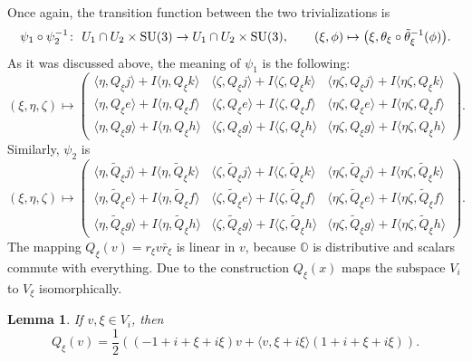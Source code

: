 \documentclass[pdftex]{sigma}
\numberwithin{equation}{section}
\newtheorem{Lemma}[Theorem]{Lemma}
\newcommand{\SO}{\mathbb{O}} %
\begin{document}
Once again, the transition function between the two trivializations is
\[\psi_1 \circ \psi_2^{-1}\colon \ U_1 \cap U_2 \times {\rm SU}(3) \rightarrow U_1 \cap U_2\times {\rm SU}(3), \qquad (\xi,\phi) \mapsto \big(\xi, \theta_\xi \circ \tilde{\theta}_\xi^{-1}(\phi) \big).\]
As it was discussed above, the meaning of $\psi_1$ is the following:
\[ (\xi,\eta,\zeta) \mapsto
\begin{pmatrix}
\langle \eta,Q_\xi j \rangle + I\langle \eta, Q_\xi k \rangle & \langle \zeta, Q_\xi j \rangle + I\langle \zeta, Q_\xi k \rangle & \langle \eta \zeta, Q_\xi j \rangle + I\langle \eta \zeta,Q_\xi k \rangle\\
\langle \eta,Q_\xi e \rangle +I\langle \eta,Q_\xi f \rangle & \langle \zeta,Q_\xi e \rangle +I\langle \zeta,Q_\xi f \rangle & \langle \eta \zeta,Q_\xi e \rangle +I\langle \eta \zeta,Q_\xi f \rangle\\
\langle \eta,Q_\xi g \rangle +I\langle \eta,Q_\xi h \rangle & \langle \zeta,Q_\xi g \rangle +I\langle \zeta,Q_\xi h \rangle & \langle \eta \zeta,Q_\xi g \rangle +I\langle \eta \zeta,Q_\xi h \rangle
\end{pmatrix}.
\]
Similarly, $\psi_2$ is
\[ (\xi,\eta,\zeta) \mapsto
\begin{pmatrix}
\langle \eta,\tilde{Q}_\xi j \rangle + I\langle \eta, \tilde{Q}_\xi k \rangle & \langle \zeta, \tilde{Q}_\xi j \rangle + I\langle \zeta, \tilde{Q}_\xi k \rangle & \langle \eta \zeta, \tilde{Q}_\xi j \rangle + I\langle \eta \zeta,\tilde{Q}_\xi k \rangle\\
\langle \eta,\tilde{Q}_\xi e \rangle +I\langle \eta,\tilde{Q}_\xi f \rangle & \langle \zeta,\tilde{Q}_\xi e \rangle +I\langle \zeta,\tilde{Q}_\xi f \rangle & \langle \eta \zeta,\tilde{Q}_\xi e \rangle +I\langle \eta \zeta,\tilde{Q}_\xi f \rangle\\
\langle \eta,\tilde{Q}_\xi g \rangle +I\langle \eta,\tilde{Q}_\xi h \rangle & \langle \zeta,\tilde{Q}_\xi g \rangle +I\langle \zeta,\tilde{Q}_\xi h \rangle & \langle \eta \zeta,\tilde{Q}_\xi g \rangle +I\langle \eta \zeta,\tilde{Q}_\xi h \rangle
\end{pmatrix}.
\]
The mapping $Q_\xi(v)= r_\xi v\bar{r}_\xi$ is linear in $v$, because $\SO$ is distributive and scalars commute with everything. Due to the construction $Q_\xi(x)$ maps the subspace $V_i$ to $V_\xi$ isomorphically.
\begin{Lemma} \label{lem:gxiv} If $v, \xi \in V_i$, then
 \[ Q_\xi(v)= \frac{1}{2}((-1+i+\xi+i\xi) v + \langle v, \xi + i\xi \rangle (1+i+\xi+i\xi)). \]
\end{Lemma}
\end{document}
